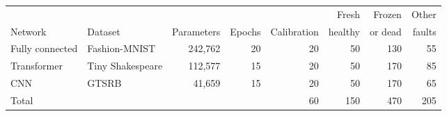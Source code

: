 \begin{tabular}{@{}llrrrrrr@{}}
\toprule
 & & & & & Fresh & Frozen & Other \\
Network & Dataset & Parameters & Epochs & Calibration & healthy & or dead & faults \\
\midrule
Fully connected & Fashion-MNIST & 242,762 & 20 & 20 & 50 & 130 & 55 \\
Transformer & Tiny Shakespeare & 112,577 & 15 & 20 & 50 & 170 & 85 \\
CNN & GTSRB & 41,659 & 15 & 20 & 50 & 170 & 65 \\
\midrule
Total & & & & 60 & 150 & 470 & 205 \\
\bottomrule
\end{tabular}
